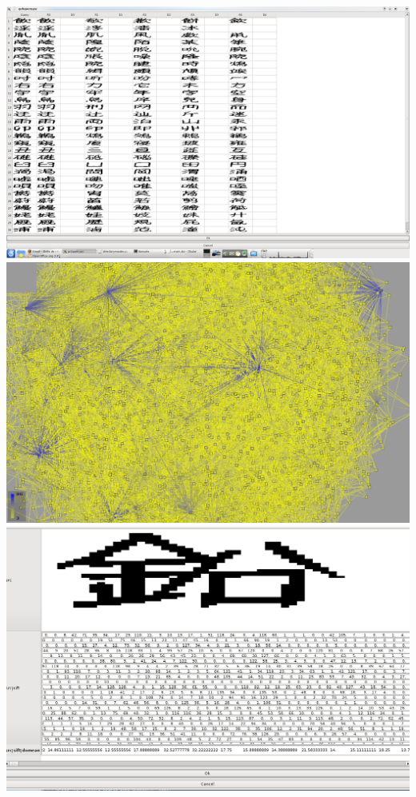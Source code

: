 \documentclass{report}
\begin{document}
\clearpage%
\includegraphics[width=16cm]{dbquery.png}
\clearpage%
\includegraphics[width=16cm]{graph001.png}
\clearpage%
\includegraphics[width=16cm]{show_features.png}
\end{document}
